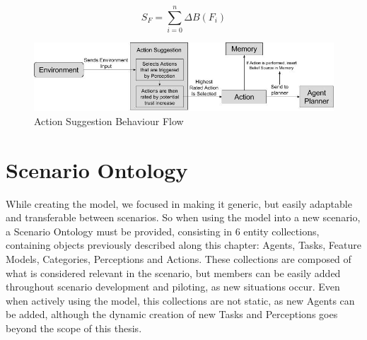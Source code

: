 \begin{equation}
    S_F = \sum_{i=0}^{n} \Delta B(F_i)
    \label{eq:ActionSuggestionLinear}
\end{equation}


\begin{figure}[hbt]
    \centering
    \includegraphics[width=\textwidth]{figures/ActionSuggestionDiagram.jpg}
    \caption{Action Suggestion Behaviour Flow}
    \label{fig:ActionSuggestionDiagram}
\end{figure}


\section{Scenario Ontology}
While creating the model, we focused in making it generic, but easily adaptable and transferable between scenarios. So when using the model into a new scenario, a Scenario Ontology must be provided, consisting in 6 entity collections, containing objects previously described along this chapter: Agents, Tasks, Feature Models, Categories, Perceptions and Actions. These collections are composed of what is considered relevant in the scenario, but members can be easily added throughout scenario development and piloting, as new situations occur. Even when actively using the model, this collections are not static, as new Agents can be added, although the dynamic creation of new Tasks and Perceptions goes beyond the scope of this thesis. 

 